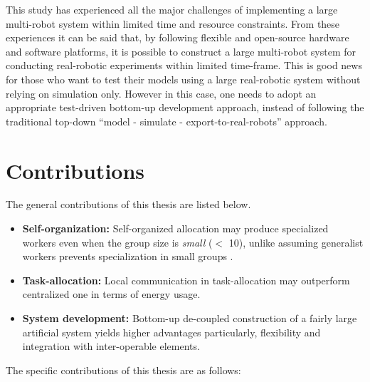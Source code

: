 This study has experienced all the major challenges of implementing a large multi-robot system within limited time and resource constraints. From these experiences it can be said that, by following flexible and open-source hardware and software platforms, it is possible to construct a large multi-robot system for conducting real-robotic experiments within limited time-frame. This is good news for those who want to test their models using a large real-robotic system without relying on simulation only. However in this case, one needs to adopt an appropriate test-driven bottom-up development approach, instead of following the traditional top-down ``model - simulate -  export-to-real-robots'' approach. 
\section{Contributions}
The general contributions of this thesis are listed below.
\begin{itemize}
    \item \textbf{Self-organization: } 
 Self-organized allocation may produce specialized workers even when the group size is \textit{small} ($<$ 10), unlike assuming generalist workers prevents specialization in small groups \cite{Garnier+2007}.
    \item \textbf{Task-allocation: }
Local communication in task-allocation may outperform centralized one in terms of energy usage.
\item \textbf{System development: }
Bottom-up de-coupled construction of a fairly large artificial system yields higher advantages particularly, flexibility and integration with inter-operable elements.%
\end{itemize}
The specific contributions of this thesis are as follows:
